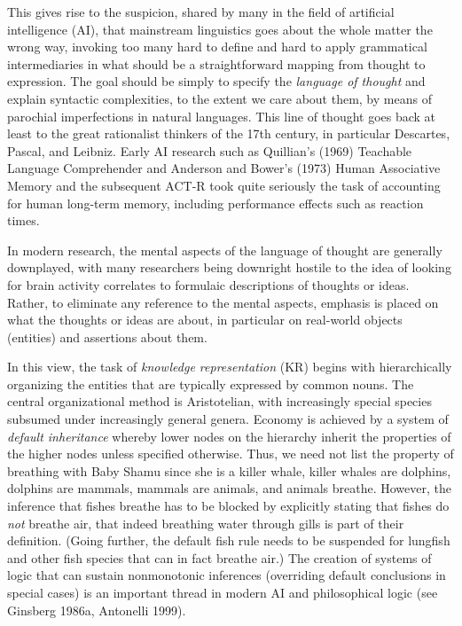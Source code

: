 This gives rise to the suspicion, shared by many in the field of artificial
intelligence (AI), that mainstream linguistics goes about the whole matter the
wrong way, invoking too many hard to define and hard to apply grammatical
intermediaries in what should be a straightforward mapping from thought to
expression. The goal should be simply to specify the {\it language of thought}
and explain syntactic complexities, to the extent we care about them, by means
of parochial imperfections in natural languages.  This line of thought goes
back at least to the great rationalist thinkers of the 17th century, in
particular Descartes, Pascal, and Leibniz.
Early AI research such as Quillian's (1969) Teachable Language Comprehender
\nocite{Quillian:1969} and Anderson and Bower's (1973) Human Associative
Memory and the subsequent ACT-R \nocite{Anderson:1973} took quite seriously
the task of accounting for human long-term memory, including performance
effects such as reaction times.  

In modern research, the mental aspects of the language of thought are
generally downplayed, with many researchers being downright hostile to the
idea of looking for brain activity correlates to formulaic descriptions of
thoughts or ideas. Rather, to eliminate any reference to the mental aspects,
emphasis is placed on what the thoughts or ideas are about, in particular on
real-world objects (entities) and assertions about them.

In this view, the task of {\it knowledge representation} (KR)
 begins with hierarchically organizing the entities that
are typically expressed by common nouns.  The central organizational method is
Aristotelian, with increasingly special species subsumed under increasingly
general genera. Economy is achieved by a system of {\it default inheritance}
whereby lower nodes on the hierarchy inherit the properties of the higher
nodes unless specified otherwise. Thus, we need not list the property of
breathing with Baby Shamu since she is a killer whale, killer whales are
dolphins, dolphins are mammals, mammals are animals, and animals breathe.
However, the inference that fishes breathe has to be blocked by explicitly
stating that fishes do {\it not} breathe air, that indeed breathing water
through gills is part of their definition. (Going further, the default fish
rule needs to be suspended for lungfish and other fish species that can in
fact breathe air.) The creation of systems of logic that can sustain
nonmonotonic inferences (overriding default conclusions in special cases) is
an important thread in modern AI and philosophical logic (see Ginsberg 1986a,
Antonelli 1999). \nocite{Antonelli:1999}


